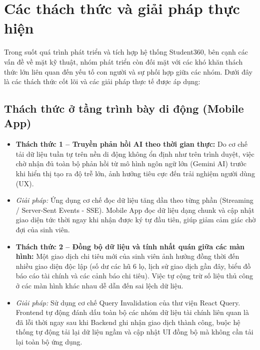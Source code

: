 \section{Các thách thức và giải pháp thực hiện}
Trong suốt quá trình phát triển và tích hợp hệ thống Student360, bên cạnh các vấn đề về mặt kỹ thuật, nhóm phát triển còn đối mặt với các khó khăn thách thức lớn liên quan đến yếu tố con người và sự phối hợp giữa các nhóm. Dưới đây là các thách thức cốt lõi và các giải pháp thực tế được áp dụng:

\subsection{Thách thức ở tầng trình bày di động (Mobile App)}
\begin{itemize}
    \item \textbf{Thách thức 1 -- Truyền phản hồi AI theo thời gian thực:} Do cơ chế tải dữ liệu tuần tự trên nền di động không ổn định như trên trình duyệt, việc chờ nhận đủ toàn bộ phản hồi từ mô hình ngôn ngữ lớn (Gemini AI) trước khi hiển thị tạo ra độ trễ lớn, ảnh hưởng tiêu cực đến trải nghiệm người dùng (UX).
    \item \textit{Giải pháp:} Ứng dụng cơ chế đọc dữ liệu tăng dần theo từng phần (Streaming / Server-Sent Events - SSE). Mobile App đọc dữ liệu dạng chunk và cập nhật giao diện tức thời ngay khi nhận được ký tự đầu tiên, giúp giảm cảm giác chờ đợi của sinh viên.
    \item \textbf{Thách thức 2 -- Đồng bộ dữ liệu và tính nhất quán giữa các màn hình:} Một giao dịch chi tiêu mới của sinh viên ảnh hưởng đồng thời đến nhiều giao diện độc lập (số dư các hũ 6 lọ, lịch sử giao dịch gần đây, biểu đồ báo cáo tài chính và các cảnh báo chi tiêu). Việc tự cộng trừ số liệu thủ công ở các màn hình khác nhau dễ dẫn đến sai lệch dữ liệu.
    \item \textit{Giải pháp:} Sử dụng cơ chế Query Invalidation của thư viện React Query. Frontend tự động đánh dấu toàn bộ các nhóm dữ liệu tài chính liên quan là đã lỗi thời ngay sau khi Backend ghi nhận giao dịch thành công, buộc hệ thống tự động tải lại dữ liệu ngầm và cập nhật UI đồng bộ mà không cần tải lại toàn bộ ứng dụng.
\end{itemize}

